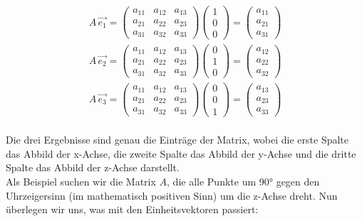 \begin{align}
A \,\vec{e_{1}} = 
\begin{pmatrix}
a_{11} & a_{12} & a_{13}\\
a_{21} & a_{22} & a_{23}\\
a_{31} & a_{32} & a_{33}
\end{pmatrix}
\begin{pmatrix}
1\\
0\\
0
\end{pmatrix}
=
\begin{pmatrix}
a_{11}\\
a_{21}\\
a_{31}
\end{pmatrix}\\
A \,\vec{e_{2}} = 
\begin{pmatrix}
a_{11} & a_{12} & a_{13}\\
a_{21} & a_{22} & a_{23}\\
a_{31} & a_{32} & a_{33}
\end{pmatrix}
\begin{pmatrix}
0\\
1\\
0
\end{pmatrix}
=
\begin{pmatrix}
a_{12}\\
a_{22}\\
a_{32}
\end{pmatrix}\\
A \,\vec{e_{3}} = 
\begin{pmatrix}
a_{11} & a_{12} & a_{13}\\
a_{21} & a_{22} & a_{23}\\
a_{31} & a_{32} & a_{33}
\end{pmatrix}
\begin{pmatrix}
0\\
0\\
1
\end{pmatrix}
=
\begin{pmatrix}
a_{13}\\
a_{23}\\
a_{33}
\end{pmatrix}
\end{align}\\
Die drei Ergebnisse sind genau die Einträge der Matrix, wobei die erste Spalte das Abbild der x-Achse, die zweite Spalte das Abbild der y-Achse und die dritte Spalte das Abbild der z-Achse darstellt.\\
Als Beispiel suchen wir die Matrix $A$, die alle Punkte um 90° gegen den Uhrzeigersinn (im mathematisch positiven Sinn) um die z-Achse dreht. Nun überlegen wir uns, was mit den Einheitsvektoren passiert:
